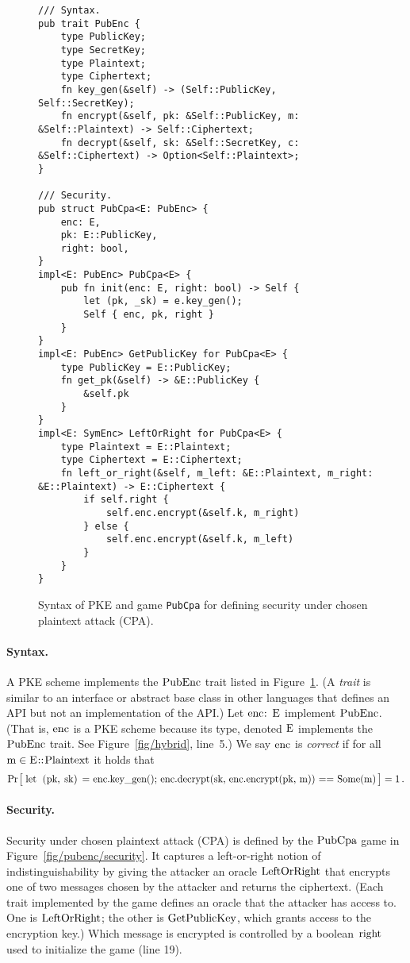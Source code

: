 \documentclass{article}
\newcommand{\Prob}[1]{\Pr\hspace{-1pt}\big[\,#1\,\big]}
\newcommand{\code}[1]{\textrm{\textup{\lstinline{#1}}}}
\begin{document}
\begin{figure}[t]
\begin{lstlisting}
/// Syntax.
pub trait PubEnc {
    type PublicKey;
    type SecretKey;
    type Plaintext;
    type Ciphertext;
    fn key_gen(&self) -> (Self::PublicKey, Self::SecretKey);
    fn encrypt(&self, pk: &Self::PublicKey, m: &Self::Plaintext) -> Self::Ciphertext;
    fn decrypt(&self, sk: &Self::SecretKey, c: &Self::Ciphertext) -> Option<Self::Plaintext>;
}

/// Security.
pub struct PubCpa<E: PubEnc> {
    enc: E,
    pk: E::PublicKey,
    right: bool,
}
impl<E: PubEnc> PubCpa<E> {
    pub fn init(enc: E, right: bool) -> Self {
        let (pk, _sk) = e.key_gen();
        Self { enc, pk, right }
    }
}
impl<E: PubEnc> GetPublicKey for PubCpa<E> {
    type PublicKey = E::PublicKey;
    fn get_pk(&self) -> &E::PublicKey {
        &self.pk
    }
}
impl<E: SymEnc> LeftOrRight for PubCpa<E> {
    type Plaintext = E::Plaintext;
    type Ciphertext = E::Ciphertext;
    fn left_or_right(&self, m_left: &E::Plaintext, m_right: &E::Plaintext) -> E::Ciphertext {
        if self.right {
            self.enc.encrypt(&self.k, m_right)
        } else {
            self.enc.encrypt(&self.k, m_left)
        }
    }
}
\end{lstlisting}
  \caption{Syntax of PKE and game \lstinline{PubCpa}
  for defining security under chosen plaintext attack (CPA).}
  \label{fig/pubenc/security}
  \label{fig/pubenc/syntax}
\end{figure}


\paragraph{Syntax.}
%
A PKE scheme implements the $\code{PubEnc}$ trait listed in
Figure~\ref{fig/pubenc/syntax}.
%
(A \emph{trait} is similar to an interface or abstract base class in other
languages that defines an API but not an implementation of the API.)
%
Let $\code{enc: E}$ implement $\code{PubEnc}$.
%
(That is, $\code{enc}$ is a PKE scheme because its type, denoted $\code{E}$
implements the $\code{PubEnc}$ trait. See Figure~\ref{fig/hybrid}, line~5.)
%
We say $\code{enc}$ is \emph{correct} if for all $\code{m} \in
\code{E::Plaintext}$ it holds that
%
\[
  \Prob{
    \code{let (pk, sk) = enc.key_gen();
    enc.decrypt(sk, enc.encrypt(pk, m)) == Some(m)}
  } = 1 \,.
\]


\paragraph{Security.}
%
Security under chosen plaintext attack (CPA) is defined by the $\code{PubCpa}$
game in Figure~\ref{fig/pubenc/security}.
%
It captures a left-or-right notion of indistinguishability by giving the
attacker an oracle \hyperref[sec/traits]{$\code{LeftOrRight}$} that encrypts
one of two messages chosen by the attacker and returns the ciphertext.
%
(Each trait implemented by the game defines an oracle that the attacker has
access to. One is $\code{LeftOrRight}$; the other is
\hyperref[sec/traits]{$\code{GetPublicKey}$}, which grants access to the
encryption key.)
%
Which message is encrypted is controlled by a boolean $\code{right}$ used to
initialize the game (line 19).
\end{document}
